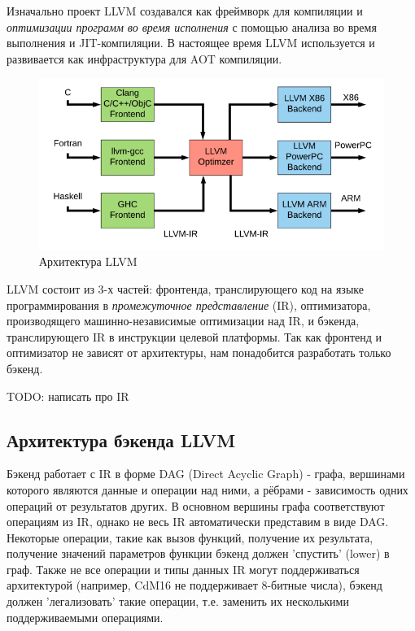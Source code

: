 \documentclass[a4paper,14pt]{extarticle}
\begin{document}
Изначально проект LLVM создавался как фреймворк для компиляции и \emph{оптимизации программ во время исполнения} с помощью анализа во время выполнения и JIT-компиляции\cite{LLVM:CGO04}. В настоящее время LLVM используется и развивается как инфраструктура для AOT компиляции.
\begin{figure}[!h]
	\begin{center}
		\includegraphics[width=\textwidth]{LLVM-Compiler-Development-architecture.png}
		\caption{Архитектура LLVM \cite{llvmpic}}
	\end{center}
\end{figure}

LLVM состоит из 3-х частей: фронтенда, транслирующего код на языке программирования в \emph{промежуточное представление} (IR), оптимизатора, производящего машинно-независимые оптимизации над IR, и бэкенда, транслирующего IR в инструкции целевой платформы. Так как фронтенд и оптимизатор не зависят от архитектуры, нам %
понадобится разработать только бэкенд.

TODO: написать про IR %

\subsection{Архитектура бэкенда LLVM}

Бэкенд работает с IR в форме DAG (Direct Acyclic Graph) - графа, вершинами которого являются данные и операции над ними, а рёбрами - зависимость одних операций от результатов других. В основном вершины графа соответствуют операциям из IR, однако не весь IR автоматически представим в виде DAG. Некоторые операции, такие как вызов функций, получение их результата, получение значений параметров функции бэкенд должен 'спустить' (lower) в граф. Также не все операции и типы данных IR могут поддерживаться архитектурой (например, CdM16 не поддерживает 8-битные числа), бэкенд должен 'легализовать' такие операции, т.е. заменить их несколькими поддерживаемыми операциями. %
\end{document}
